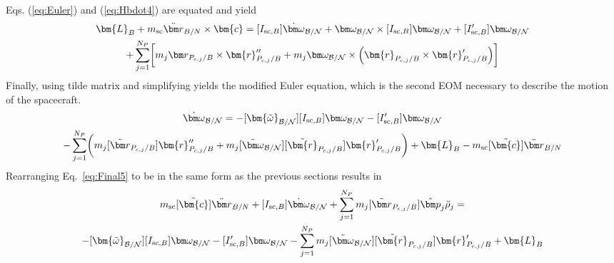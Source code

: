 Eqs. (\ref{eq:Euler}) and (\ref{eq:Hbdot4}) are equated and yield
\begin{multline}
	\bm{L}_B+m_{\text{sc}}\ddot{\bm r}_{B/N}\times\bm{c} = [I_{\text{sc},B}] \dot{\bm\omega}_{\cal B/N} + \bm\omega_{\cal B/N} \times [I_{\text{sc},B}] \bm\omega_{\cal B/N} + [I'_{\text{sc},B}] \bm\omega_{\cal B/N}
	\\+ \sum\limits_{j=1}^{N_P}\biggl[m_j \bm r_{P_{c,j}/B}\times\bm{r}''_{P_{c,j}/B}
	+ m_j \bm\omega_{\cal B/N} \times \Bigl(\bm{r}_{P_{c,j}/B} \times \bm{r}'_{P_{c,j}/B}\Bigr)\biggr]
	\label{eq:Hbdot5}
\end{multline}
Finally, using tilde matrix and simplifying yields the modified Euler equation, which is the second EOM necessary to describe the motion of the spacecraft.
\begin{multline}
	[I_{\text{sc},B}] \dot{\bm\omega}_{\cal B/N} = -[\bm{\tilde{\omega}}_{\cal B/N}] [I_{\text{sc},B}] \bm\omega_{\cal B/N} - [I'_{\text{sc},B}] \bm\omega_{\cal B/N}	\\- \sum\limits_{j=1}^{N_P}\biggl(m_j [\tilde{\bm r}_{P_{c,j}/B}]\bm{r}''_{P_{c,j}/B}
	+ m_j [\tilde{\bm\omega}_{\cal B/N}] [\tilde{\bm{r}}_{P_{c,j}/B}] \bm{r}'_{P_{c,j}/B}\biggr)
	+ \bm{L}_B - m_{\text{sc}} [\tilde{\bm{c}}] \ddot{\bm r}_{B/N}
	\label{eq:Final5}
\end{multline}
Rearranging Eq.~\eqref{eq:Final5} to be in the same form as the previous sections results in
\begin{multline}
	m_{\text{sc}}[\tilde{\bm{c}}]\ddot{\bm r}_{B/N}+[I_{\text{sc},B}] \dot{\bm\omega}_{\cal B/N} + \sum\limits_{j=1}^{N_P}m_j [\tilde{\bm r}_{P_{c,j}/B}] \hat{\bm p}_j \ddot{\rho}_j = \\
	-[\bm{\tilde{\omega}}_{\cal B/N}] [I_{\text{sc},B}] \bm\omega_{\cal B/N}
	- [I'_{\text{sc},B}] \bm\omega_{\cal B/N} 	- \sum\limits_{j=1}^{N_P} m_j [\tilde{\bm\omega}_{\cal B/N}] [\tilde{\bm{r}}_{P_{c,j}/B}] \bm{r}'_{P_{c,j}/B} + \bm{L}_B
	\label{eq:Final6}
\end{multline}

